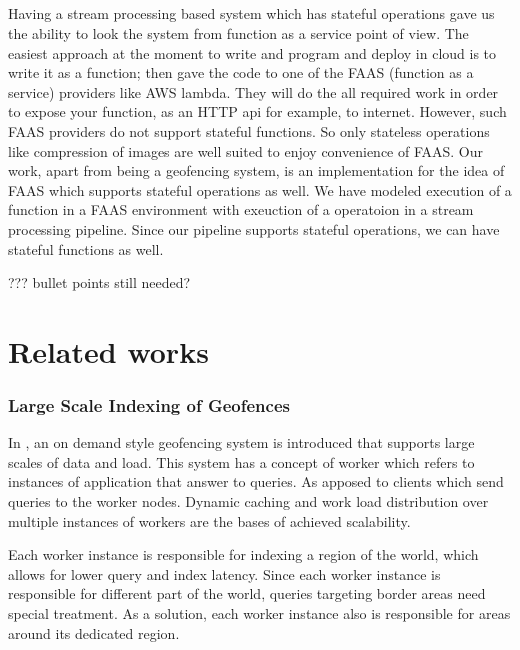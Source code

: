 \documentclass[a4]{report}
\begin{document}
    \paragraph{}
    Having a stream processing based system which has stateful operations gave us the ability to look the system from
    function as a service point of view.
    The easiest approach at the moment to write and program and deploy in cloud is to write it as a function;
    then gave the code to one of the FAAS (function as a service) providers like AWS lambda.
    They will do the all required work in order to expose your function, as an HTTP api for example, to internet.
    However, such FAAS providers do not support stateful functions.
    So only stateless operations like compression of images are well suited to enjoy convenience of FAAS.
    Our work, apart from being a geofencing system, is an implementation for the idea of FAAS which supports stateful
    operations as well.
    We have modeled execution of a function in a FAAS environment with exeuction of a operatoion in a stream
    processing pipeline.
    Since our pipeline supports stateful operations, we can have stateful functions as well.

    ??? bullet points still needed?


    \chapter{Related works}

    \subsection{Large Scale Indexing of Geofences}
    In \cite{Cirillo-Jacobs-Martin-Szczytowski-2014}, an on demand style geofencing system is introduced that
    supports large scales of data and load.
    This system has a concept of worker which refers to instances of application that answer to queries.
    As apposed to clients which send queries to the worker nodes.
    Dynamic caching and work load distribution over multiple instances of workers are the bases of achieved
    scalability.

    Each worker instance is responsible for indexing a region of the world, which allows for lower query and index latency.
    Since each worker instance is responsible for different part of the world, queries targeting border areas need
    special treatment.
    As a solution, each worker instance also is responsible for areas around its dedicated region.
\end{document}
